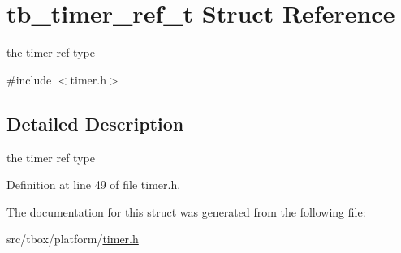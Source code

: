 \hypertarget{structtb__timer__ref__t}{\section{tb\-\_\-timer\-\_\-ref\-\_\-t Struct Reference}
\label{structtb__timer__ref__t}
}


the timer ref type  




{\ttfamily \#include $<$timer.\-h$>$}



\subsection{Detailed Description}
the timer ref type 

Definition at line 49 of file timer.\-h.



The documentation for this struct was generated from the following file\-:\begin{DoxyCompactItemize}
\item 
src/tbox/platform/\hyperlink{timer_8h}{timer.\-h}\end{DoxyCompactItemize}
